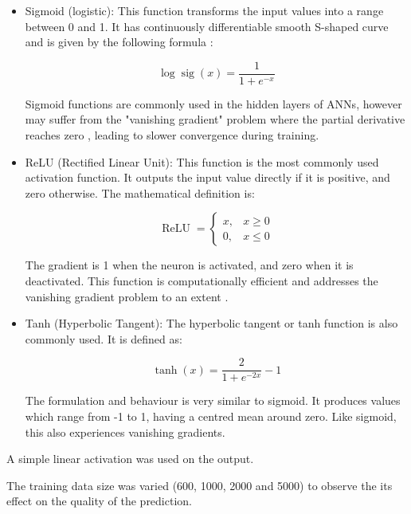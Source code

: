 \begin{itemize}
	\item Sigmoid (logistic): This function transforms the input values into a range between 0 and 1. It has continuously differentiable smooth S-shaped curve and is given by the following formula \cite{Han1995}:
	
	\begin{equation}\label{Logistic sigmoid}
		\log \operatorname{sig}(x)=\frac{1}{1+e^{-x}}
	\end{equation} 

	Sigmoid functions are commonly used in the hidden layers of ANNs, however may suffer from the "vanishing gradient" problem where the partial derivative reaches zero \cite{Sharma2020}, leading to slower convergence during training.

	\item ReLU (Rectified Linear Unit): This function is the most commonly used activation function. It outputs the input value directly if it is positive, and zero otherwise. The mathematical definition is:
	
	\begin{equation}\label{ReLU}
		\operatorname{ReLU}= \begin{cases}x, & x \geq 0 \\ 0, & x \leq 0\end{cases}
	\end{equation}

	The gradient is 1 when the neuron is activated, and zero when it is deactivated. This function is computationally efficient and addresses the vanishing gradient problem to an extent \cite{Sharma2020}.
	
	\item Tanh (Hyperbolic Tangent): The hyperbolic tangent or tanh function is also commonly used. It is defined as:
	
	\begin{equation}\label{Hyperbolic tangent}
		\tanh (x)=\frac{2}{1+e^{-2 x}}-1
	\end{equation}

	The formulation and behaviour is very similar to sigmoid. It produces values which range from -1 to 1, having a centred mean around zero. Like sigmoid, this also experiences vanishing gradients.
	
\end{itemize}

A simple linear activation was used on the output.

The training data size was varied (600, 1000, 2000 and 5000) to observe the its effect on the quality of the prediction.

